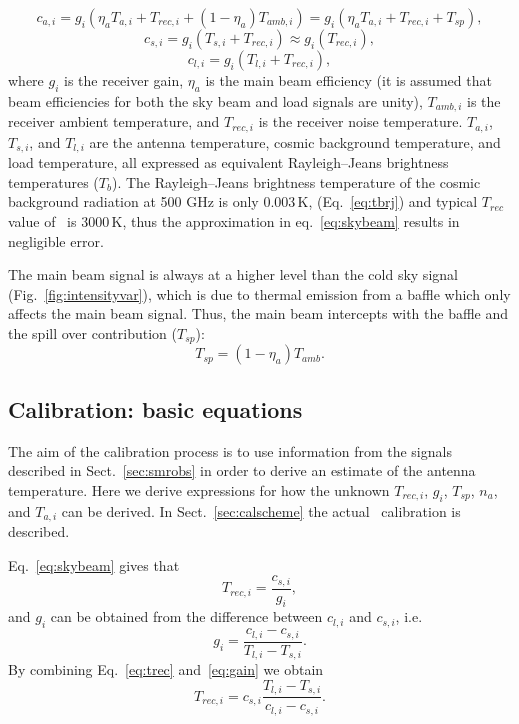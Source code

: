 \begin{equation}
c_{a,i}=g_{i}\left(\eta_{a} T_{a,i} + T_{rec,i} + (1-\eta_{a})T_{amb,i} \right) = 
g_{i}\left(\eta_{a} T_{a,i} + T_{rec,i} + T_{sp} \right) ,
\end{equation}
\begin{equation}
\label{eq:skybeam}
c_{s,i}=g_{i}\left(T_{s,i}+T_{rec,i}\right) \approx g_{i}\left(T_{rec,i}\right),
\end{equation}
\begin{equation}
c_{l,i}=g_{i}\left(T_{l,i}+T_{rec,i}\right),
\end{equation}
where \(g_{i}\) is the receiver gain, \(\eta_{a}\) is the main beam
efficiency (it is assumed that beam efficiencies for
both the sky beam and load signals are unity),
\(T_{amb,i}\) is the receiver ambient temperature,
and \(T_{rec,i}\) is the receiver noise temperature.
\(T_{a,i}\), \(T_{s,i}\), and \(T_{l,i}\) are the antenna temperature,
cosmic background temperature, and load temperature, all expressed
as equivalent Rayleigh--Jeans brightness temperatures (\(T_{b}\)).
The Rayleigh--Jeans brightness temperature of the cosmic background radiation
at 500 GHz is only 0.003\,K, (Eq.~\ref{eq:tbrj}) and typical \(T_{rec}\) value of \smr\ is 3000\,K,
thus the approximation in eq.~\ref{eq:skybeam} results in negligible error.

The main beam signal is always at a higher level than the cold sky signal
(Fig.~\ref{fig:intensityvar}), which is due 
to thermal emission from a baffle which only affects the main beam signal.
Thus, the main beam intercepts with the baffle
and the spill over contribution (\(T_{sp}\)):
\begin{equation}
\label{eq:tspill1}
T_{sp}=(1-\eta_{a})T_{amb}.
\end{equation}

\subsection{Calibration: basic equations}
\label{sec:caleq}
The aim of the calibration process is to use  
information from the signals described in Sect.~\ref{sec:smrobs}
in order to derive an estimate of the antenna temperature.
Here we derive expressions for how the unknown \(T_{rec,i}\),
\(g_{i}\), \(T_{sp}\), \(n_{a}\), and \(T_{a,i}\) can be derived.
In Sect.~\ref{sec:calscheme} the actual \smr\ calibration is described. 

Eq.~\ref{eq:skybeam} gives that
\begin{equation}
\label{eq:trec}
T_{rec,i}=\frac{c_{s,i}}{g_{i}},
\end{equation}
and \(g_{i}\) can be obtained from the difference between \(c_{l,i}\) and
 \(c_{s,i}\), i.e.
\begin{equation}
\label{eq:gain}
g_{i}=\frac{c_{l,i}-c_{s,i}}{T_{l,i}-T_{s,i}}.
\end{equation}
By combining Eq.~\ref{eq:trec} and~\ref{eq:gain} we obtain
\begin{equation}
\label{eq:trec2}
T_{rec,i}=c_{s,i}\frac{{T_{l,i}-T_{s,i}}}{c_{l,i}-c_{s,i}}.
\end{equation}

